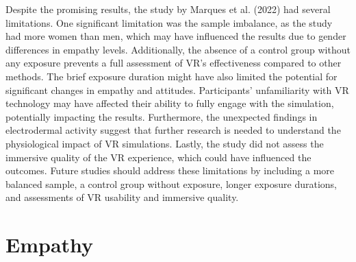 Despite the promising results, the study by Marques et al. (2022) had several limitations. One significant limitation was the sample imbalance, as the study had more women than men, which may have influenced the results due to gender differences in empathy levels. Additionally, the absence of a control group without any exposure prevents a full assessment of VR's effectiveness compared to other methods. The brief exposure duration might have also limited the potential for significant changes in empathy and attitudes. Participants' unfamiliarity with VR technology may have affected their ability to fully engage with the simulation, potentially impacting the results. Furthermore, the unexpected findings in electrodermal activity suggest that further research is needed to understand the physiological impact of VR simulations. Lastly, the study did not assess the immersive quality of the VR experience, which could have influenced the outcomes. Future studies should address these limitations by including a more balanced sample, a control group without exposure, longer exposure durations, and assessments of VR usability and immersive quality.

\section{Empathy}




